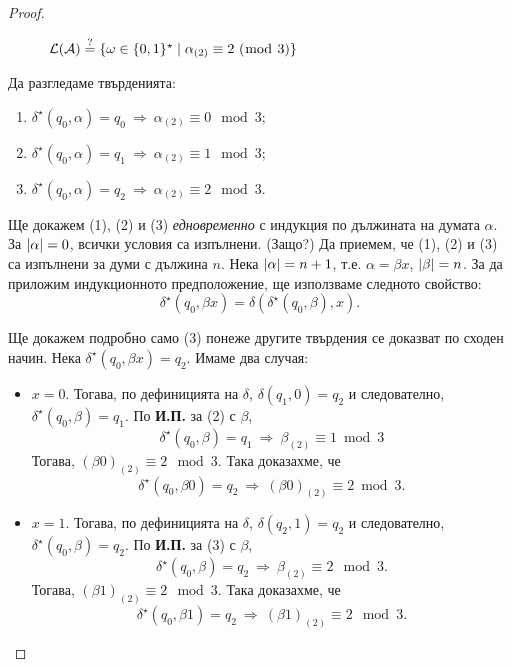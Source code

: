 \begin{proof}
\begin{figure}[H]
\begin{center}
      \end{center}
      \caption{$\L(\A) \stackrel{?}{=} \{\omega\in\{0,1\}^\star \mid \alpha_{(2)} \equiv 2\ (\bmod\ 3)\}$}
 \end{figure}
 \noindent Да разгледаме твърденията:
 \begin{enumerate}[(1)]
  \item 
    $\delta^\star(q_0,\alpha) = q_0\ \Rightarrow\ \alpha_{(2)} \equiv 0 \mod 3$;
  \item 
    $\delta^\star(q_0,\alpha) = q_1\ \Rightarrow\ \alpha_{(2)} \equiv 1 \mod 3$;
  \item 
    $\delta^\star(q_0,\alpha) = q_2\ \Rightarrow\ \alpha_{(2)} \equiv 2 \mod 3$.
  \end{enumerate}
  Ще докажем (1), (2) и (3) {\em едновременно} с индукция по дължината на думата $\alpha$.
  За $\lvert{\alpha}\rvert = 0$, всички условия са изпълнени. (Защо?)
  Да приемем, че (1), (2) и (3) са изпълнени за думи с дължина $n$.
  Нека $\lvert{\alpha}\rvert = n+1$, т.е. $\alpha = \beta x$, $\lvert{\beta}\rvert = n$.
  За да приложим индукционното предположение, ще използваме следното свойство:
  \[\delta^\star(q_0,\beta x) = \delta(\delta^\star(q_0,\beta),x).\]
  
  Ще докажем подробно само (3) понеже другите твърдения се доказват по сходен начин.
  Нека $\delta^\star(q_0,\beta x) = q_2$. 
  Имаме два случая:
  \begin{itemize}
  \item 
    $x = 0$. 
    Тогава, по дефиницията на $\delta$, 
    $\delta(q_1,0) = q_2$ и следователно, $\delta^\star(q_0,\beta) = q_1$.
    По {\bf И.П.} за (2) с $\beta$,
    \[\delta^\star(q_0,\beta) = q_1\ \Rightarrow\ \beta_{(2)} \equiv 1 \bmod 3\]
    Тогава, $(\beta0)_{(2)} \equiv 2 \mod 3$. Така доказахме, че
    \[\delta^\star(q_0,\beta 0) = q_2\ \Rightarrow\ (\beta 0)_{(2)} \equiv 2 \bmod 3.\]
  \item
    $x = 1$.
    Тогава, по дефиницията на $\delta$, $\delta(q_2,1) = q_2$ и следователно,
    $\delta^\star(q_0,\beta) = q_2$.
    По {\bf И.П.} за (3) с $\beta$,
    \[\delta^\star(q_0,\beta) = q_2\ \Rightarrow\ \beta_{(2)} \equiv 2 \mod 3.\]
    Тогава, $(\beta1)_{(2)} \equiv 2 \mod 3$. Така доказахме, че
    \[\delta^\star(q_0,\beta 1) = q_2\ \Rightarrow\ (\beta 1)_{(2)} \equiv 2 \mod 3.\]
  \end{itemize}
  

\end{proof}
